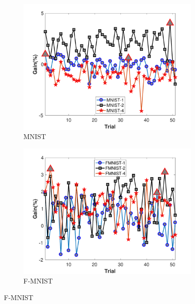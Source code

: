 \begin{figure}
	\label{fig:delta}
\end{figure}
\begin{figure}
	\begin{subfigure}[b]{.46\linewidth}{}
		\includegraphics[keepaspectratio = True, scale = 0.31]{figures/MNIST_25}
		\centering
		\caption{MNIST}
		\vspace{2.0em}
	\end{subfigure}
	\begin{subfigure}[b]{.46\linewidth}
		\includegraphics[keepaspectratio = True, scale = 0.31]{figures/FMNIST_25}
		\caption{F-MNIST}
		\vspace{2.0em}
	\end{subfigure}
	
	\label{fig:trial1}
\end{figure}
